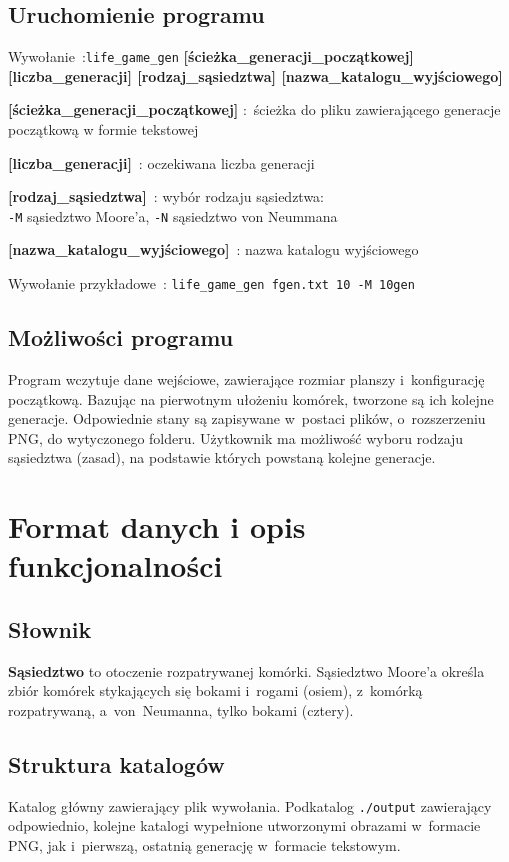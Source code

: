 \documentclass[a4paper,11pt]{article}
\begin{document}
		\subsection{Uruchomienie programu}
			Wywołanie~:\texttt{life\_game\_gen} \textbf{[ścieżka\_generacji\_początkowej] [liczba\_generacji] [rodzaj\_sąsiedztwa] [nazwa\_katalogu\_wyjściowego]}
			
		\begin{description}
			\item \textbf{[ścieżka\_generacji\_początkowej]}   :~ścieżka do pliku zawierającego generacje początkową w formie tekstowej
			\item \textbf{[liczba\_generacji]}~: oczekiwana liczba generacji
			\item \textbf{[rodzaj\_sąsiedztwa]}~: wybór rodzaju sąsiedztwa:\\ \texttt{-M} sąsiedztwo Moore'a, \texttt{-N} sąsiedztwo von Neummana
			\item \textbf{[nazwa\_katalogu\_wyjściowego]}~: nazwa katalogu wyjściowego
		\end{description}
		Wywołanie przykładowe~: \texttt{life\_game\_gen fgen.txt 10 -M 10gen}
		\subsection{Możliwości programu}
			Program wczytuje dane wejściowe, zawierające rozmiar planszy i~konfigurację początkową.
			Bazując na pierwotnym ułożeniu komórek, tworzone są ich kolejne generacje. Odpowiednie stany są zapisywane w~postaci plików, o~rozszerzeniu PNG, do wytyczonego folderu. Użytkownik ma możliwość wyboru rodzaju sąsiedztwa (zasad), na podstawie których powstaną kolejne generacje.	
		\section{Format danych i opis funkcjonalności} 
			\subsection{Słownik}
				\textbf{Sąsiedztwo} to otoczenie rozpatrywanej komórki. Sąsiedztwo Moore'a określa zbiór komórek stykających się bokami i~rogami (osiem), z~komórką rozpatrywaną, a~von~Neumanna, tylko bokami (cztery).
			\subsection{Struktura katalogów}
				Katalog główny zawierający plik wywołania. Podkatalog \texttt{./output} zawierający odpowiednio, kolejne katalogi wypełnione utworzonymi obrazami w~formacie PNG, jak i~pierwszą, ostatnią generację w~formacie tekstowym.
\end{document}

